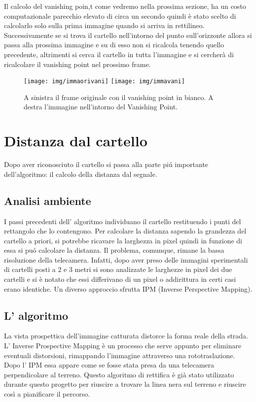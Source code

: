 		Il calcolo del vanishing poin,t come vedremo nella prossima sezione, ha un costo computazionale parecchio elevato di circa un secondo quindi è stato scelto di calcolarlo solo sulla prima immagine quando si arriva in rettilineo. Successivamente se si trova il cartello nell'intorno del punto sull'orizzonte allora si passa alla prossima immagine e su di esso non si ricalcola tenendo quello precedente, altrimenti si cerca il cartello in tutta l'immagine e si cercherà di ricalcolare il vanishing point nel prossimo frame.

		\begin{figure}[!ht]
			\centering
			\texttt{[image: img/immaorivani]}
			\texttt{[image: img/immavani]}
			\caption[Esempio vanishin Point calcolato]{A sinistra il frame originale con il vanishing point in bianco. A destra l'immagine nell'intorno del Vanishing Point.}
		\end{figure}

\section{Distanza dal cartello}
	
	Dopo aver riconosciuto il cartello si passa alla parte pi\'u importante dell'algoritmo: il calcolo della distanza dal segnale.

	\subsection{Analisi ambiente}

		I passi precedenti dell' algoritmo individuano il cartello restituendo i punti del rettangolo che lo contengono. Per calcolare la distanza sapendo la grandezza del cartello a priori, si potrebbe ricavare la larghezza in pixel quindi in funzione di essa si pu\'o calcolare la distanza. Il problema, comunque, rimane la bassa risoluzione della telecamera. Infatti, dopo aver preso delle immagini sperimentali di cartelli posti a 2 e 3 metri si sono analizzate le larghezze in pixel dei due cartelli e si è notato che essi differivano di un pixel o addirittura in certi casi erano identiche. Un diverso approccio sfrutta IPM (Inverse Perspective Mapping).
		
	\subsection{L' algoritmo}

		La vista prospettica dell'immagine catturata distorce la forma reale della strada. L' Inverse Prospective Mapping è un processo che serve appunto per eliminare eventuali distorsioni, rimappando l'immagine attraverso una rototraslazione. Dopo l' IPM essa appare come se fosse stata presa da una telecamera perpendicolare al terreno. Questo algoritmo di rettifica è già stato utilizzato durante questo progetto\cite{Rettifica} per riuscire a trovare la linea nera sul terreno e riuscire così a pianificare il percorso.

